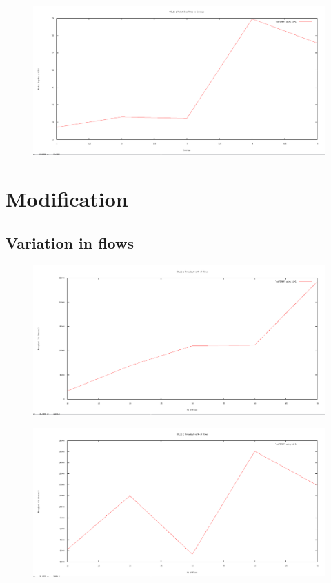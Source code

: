 \documentclass[12pt]{article}
\begin{document}
\begin{figure}[H]
	\centering
	\includegraphics[scale=	0.26]{image/802.15.4/Packetdropratio_vs_coverage.png}
\end{figure}





\newpage
\section{Modification}

\subsection{Variation in flows}

\begin{figure}[H]
	\centering
	\includegraphics[scale=	0.26]{image/bpics/bm_Throughput_vs_flows.png}
\end{figure}

\begin{figure}[H]
	\centering
	\includegraphics[scale=	0.26]{image/apics/am_Throughput_vs_flows.png}
\end{figure}
\end{document}
